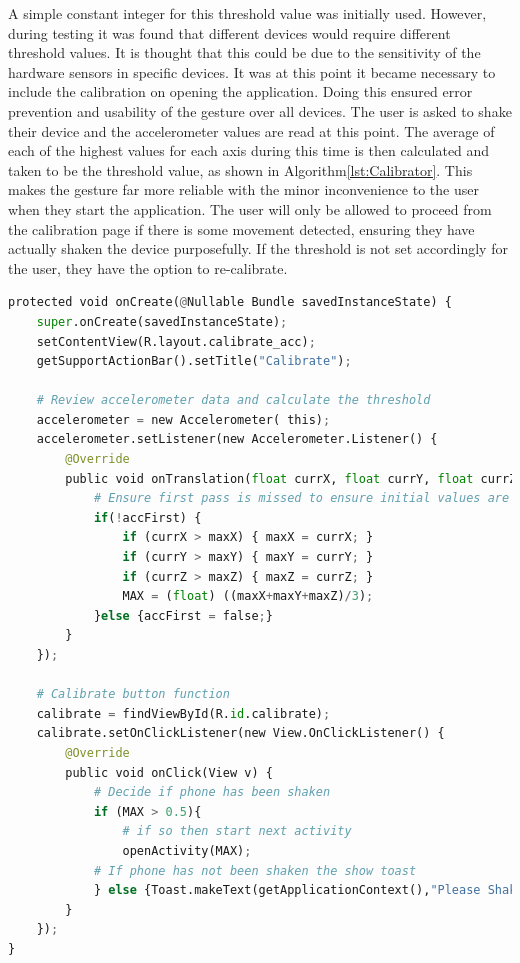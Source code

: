 \documentclass{l4proj}
\begin{document}
A simple constant integer for this threshold value was initially used. However, during testing it was found that different devices would require different threshold values. It is thought that this could be due to the sensitivity of the hardware sensors in specific devices. It was at this point it became necessary to include the calibration on opening the application. Doing this ensured error prevention and usability of the gesture over all devices. The user is asked to shake their device and the accelerometer values are read at this point. The average of each of the highest values for each axis during this time is then calculated and taken to be the threshold value, as shown in Algorithm\ref{lst:Calibrator}. This makes the gesture far more reliable with the minor inconvenience to the user when they start the application. The user will only be allowed to proceed from the calibration page if there is some movement detected, ensuring they have actually shaken the device purposefully. If the threshold is not set accordingly for the user, they have the option to re-calibrate.

\begin{lstlisting}[language=python, float, caption={Java Code used to implement the Calibration stage on opening the application. Showing how the shake gesture threshold is calculated and how this step is enforced.}, label=lst:Calibrator]
protected void onCreate(@Nullable Bundle savedInstanceState) {
    super.onCreate(savedInstanceState);
    setContentView(R.layout.calibrate_acc);
    getSupportActionBar().setTitle("Calibrate");

    # Review accelerometer data and calculate the threshold
    accelerometer = new Accelerometer( this);
    accelerometer.setListener(new Accelerometer.Listener() {
        @Override
        public void onTranslation(float currX, float currY, float currZ) {
            # Ensure first pass is missed to ensure initial values are not compared
            if(!accFirst) {
                if (currX > maxX) { maxX = currX; }
                if (currY > maxY) { maxY = currY; }
                if (currZ > maxZ) { maxZ = currZ; }
                MAX = (float) ((maxX+maxY+maxZ)/3);
            }else {accFirst = false;}
        }
    });

    # Calibrate button function
    calibrate = findViewById(R.id.calibrate);
    calibrate.setOnClickListener(new View.OnClickListener() {
        @Override
        public void onClick(View v) {
            # Decide if phone has been shaken
            if (MAX > 0.5){
                # if so then start next activity
                openActivity(MAX);
            # If phone has not been shaken the show toast 
            } else {Toast.makeText(getApplicationContext(),"Please Shake",Toast.LENGTH_SHORT).show();}
        }
    });
}
\end{lstlisting}
\end{document}
